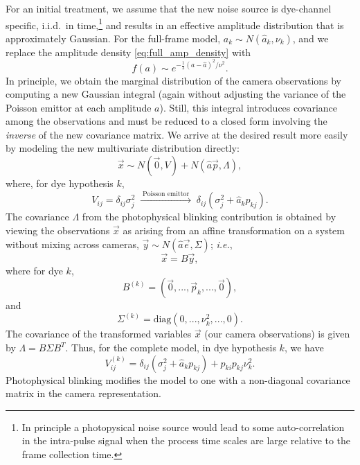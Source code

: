 \documentclass[10pt]{article}
\newcommand{\half}{\frac{1}{2}}
\newcommand{\ie}{\emph{i.e.}}
\newcommand{\normdist}[2]{\ensuremath{N(#1, #2)}}
\begin{document}
For an initial treatment, we assume that the new noise source is dye-channel specific, i.i.d.~in time,\footnote{
	In principle a photopysical noise source would lead to some auto-correlation in the intra-pulse signal when the process time scales are large relative to the frame collection time.
}
and results in an effective amplitude distribution that is approximately Gaussian.
For the full-frame model, $a_k \sim N(\hat{a}_k,\nu_k)$,
and we replace the amplitude density \eqref{eq:full_amp_density} with
\begin{equation}
f(a) \sim e^{-\half(a-\hat{a})^2/\nu^2}.
\end{equation}
In principle, we obtain the marginal distribution of the camera observations by computing a new Gaussian integral (again without adjusting the variance of the Poisson emittor at each amplitude $a$).
Still, this integral introduces covariance among the observations and must be reduced to a closed form involving the \emph{inverse} of the new covariance matrix.
We arrive at the desired result more easily by modeling the new multivariate distribution directly:
\begin{equation}
\vec{x} \sim \normdist{\vec{0}}{V} + \normdist{\hat{a}\vec{p}}{\Lambda},
\end{equation}
where, for dye hypothesis $k$,
\begin{equation}
\label{eq:var_adjust_signal}
V_{ij} = \delta_{ij}\sigma_j^2 \;\xrightarrow{\;\text{Poisson emittor}\;}\; \delta_{ij}(\sigma_j^2 + \hat{a}_k p_{kj}).
\end{equation}
The covariance $\Lambda$ from the photophysical blinking contribution is obtained by viewing the observations $\vec{x}$ as arising from an affine transformation on a system without mixing across cameras, $\vec{y} \sim \normdist{\hat{a}\vec{e}}{\Sigma}$; \ie,
$$
\vec{x} = B\vec{y},
$$
where for dye $k$,
$$
B^{(k)} = (\vec{0},...,\vec{p}_k,...,\vec{0}),
$$
and
$$
\Sigma^{(k)} = \text{diag}(0,...,\nu_k^2,...,0).
$$
The covariance of the transformed variables $\vec{x}$ (our camera observations) is given by $\Lambda = B \Sigma B^T.$
Thus, for the complete model, in dye hypothesis $k$, we have
\begin{equation}
\label{eq:var_adjust_photophys}
V_{ij}^{(k)} = \delta_{ij}(\sigma_j^2 + \hat{a}_k p_{kj}) + p_{ki} p_{kj} \nu_k^2.
\end{equation}
Photophysical blinking modifies the model to one with a non-diagonal covariance matrix in the camera representation.
\end{document}
